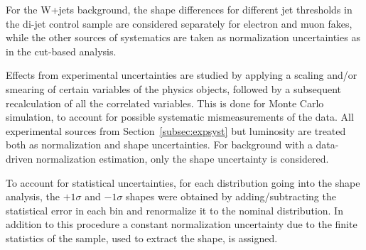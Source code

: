For the W+jets background, the shape differences for different jet \pt thresholds in the 
di-jet control sample are considered separately for electron and muon fakes, while the
other sources of systematics are taken as normalization uncertainties as in the cut-based
analysis.

Effects from experimental uncertainties are studied by applying a scaling and/or
smearing of certain variables of the physics objects, followed by a subsequent
recalculation of all the correlated variables. This is done for Monte Carlo
simulation, to account for possible systematic mismeasurements of the data.
All experimental sources from Section~\ref{subsec:expsyst} but luminosity
are treated both as normalization and shape uncertainties.
For background with a data-driven normalization estimation,
only the shape uncertainty is considered.

To account for statistical uncertainties, for each distribution going into the shape analysis, 
the $+1\sigma$ and $-1\sigma$ shapes were obtained by adding/subtracting the statistical error 
in each bin and renormalize it to the nominal distribution. In addition to this procedure a constant 
normalization uncertainty due to the finite statistics of the sample, used to extract the shape, is assigned.
